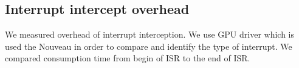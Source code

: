 \subsection{Interrupt intercept overhead}
We measured overhead of interrupt interception.
We use GPU driver which is used the Nouveau in order to compare and identify the type of interrupt.
We compared consumption time from begin of ISR to the end of ISR.

